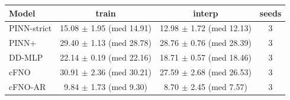 \begin{tabular}{lccc}
\toprule
Model & train & interp & seeds \\
\midrule
PINN-strict & 15.08 $\pm$ 1.95 (med 14.91) & 12.98 $\pm$ 1.72 (med 12.13) & 3 \\
PINN+ & 29.40 $\pm$ 1.13 (med 28.78) & 28.76 $\pm$ 0.76 (med 28.39) & 3 \\
DD-MLP & 22.14 $\pm$ 0.19 (med 22.16) & 18.71 $\pm$ 0.57 (med 18.46) & 3 \\
cFNO & 30.91 $\pm$ 2.36 (med 30.21) & 27.59 $\pm$ 2.68 (med 26.53) & 3 \\
cFNO-AR & 9.84 $\pm$ 1.73 (med 9.30) & 8.70 $\pm$ 2.45 (med 7.57) & 3 \\
\bottomrule
\end{tabular}
